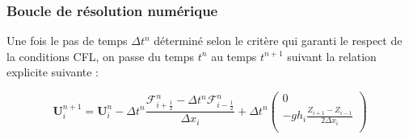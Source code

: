 \documentclass[
11pt, %
francais, %
singlespacing, %
headsepline, %
]{MastersDoctoralThesis} %
\begin{document}
    \hypertarget{boucle-de-ruxe9solution-numuxe9rique}{%
\subsubsection*{Boucle de résolution
numérique}\label{boucle-de-ruxe9solution-numuxe9rique}}

Une fois le pas de temps \(\Delta t^n\) déterminé selon le critère qui
garanti le respect de la conditions CFL, on passe du temps \(t^n\) au
temps \(t^{n+1}\) suivant la relation explicite suivante :

\[\textbf{U}_i^{n+1}=\textbf{U}_i^{n}-\Delta t^n\frac{\mathcal{F}_{i+\frac{1}{2}}^n - \Delta t^n\mathcal{F}_{i-\frac{1}{2}}^n}{\Delta x_i}+\Delta t^n \begin{pmatrix}
0 \\
-gh_i \frac{Z_{i+1}-Z_{i-1}}{2\Delta x_i}\\
\end{pmatrix}\]
\end{document}
